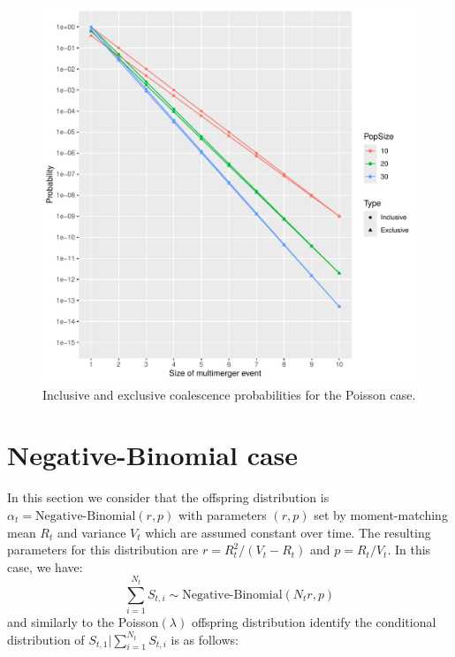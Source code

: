 \documentclass{article}
\begin{document}
\begin{figure}[!p]
\begin{center}
\includegraphics[width=15cm]{../run/figurePois.pdf}
\end{center}
\caption{Inclusive and exclusive coalescence probabilities for the Poisson case.
\label{fig:pois}}
\end{figure}

\section{Negative-Binomial case}

In this section we consider that the offspring distribution is $\alpha_t=\text{Negative-Binomial}(r,p)$ with parameters $(r,p)$ set by moment-matching mean $R_t$ and variance $V_t$
which are assumed constant over time.
The resulting parameters for this distribution are $r=R_t^2/(V_t-R_t)$ and $p=R_t/V_t$.
In this case, we have:
	\begin{equation}
		\sum_{i=1}^{N_t} S_{t,i} \sim \text{Negative-Binomial}(N_t r,p)
	\end{equation}
and similarly to the Poisson$(\lambda)$ offspring distribution identify the conditional distribution of $S_{t,1} | \sum_{i=1}^{N_t} S_{t,i}$ is as follows:
\end{document}
